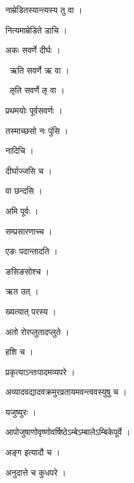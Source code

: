 \documentclass[10pt, openany, oneside]{book}
\begin{document}
\noindent नाम्रेडितस्यान्त्यस्य तु वा ।

\noindent नित्यमाम्रेडिते डाचि ।

\noindent अकः सवर्णे दीर्घः ।

\par\noindent\hspace{1.5em}{\vps वा॰}~{\qt ऋति सवर्णे ऋ वा ।}

\par\noindent\hspace{1.5em}{\vps वा॰}~{\qt ऌति सवर्णे ऌ वा ।}

\noindent प्रथमयोः पूर्वसवर्णः ।

\noindent तस्माच्छसो नः पुंसि ।

\noindent नादिचि ।

\noindent दीर्घाज्जसि च ।

\noindent वा छन्दसि ।

\noindent अमि पूर्वः ।

\noindent सम्प्रसारणाच्च ।

\noindent एङः पदान्तादति ।

\noindent ङसिङसोश्च ।

\noindent ऋत उत् ।

\noindent ख्यत्यात् परस्य ।

\noindent अतो रोरप्लुतादप्लुते ।

\noindent हशि च ।

\noindent प्रकृत्याऽन्तःपादमव्यपरे ।

\noindent अव्यादवद्यादवक्रमुरव्रतायमवन्त्ववस्युषु च ।

\noindent यजुष्युरः ।

\noindent आपोजुषाणोवृष्णोवर्षिष्ठेऽम्बेऽम्बालेऽम्बिकेपूर्वे ।

\noindent अङ्ग इत्यादौ च ।

\noindent अनुदात्ते च कुधपरे ।
\end{document}

